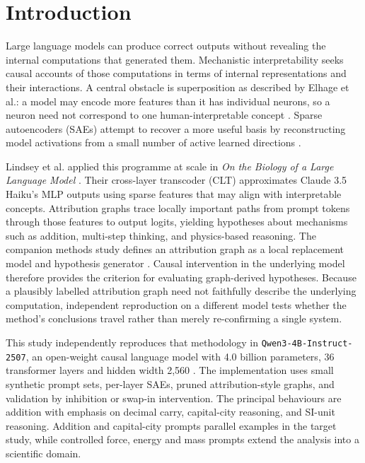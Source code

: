 \documentclass[11pt,a4paper]{article}
\newcommand{\model}{\texttt{Qwen3-4B-Instruct-2507}\xspace}
\begin{document}
\clearpage
\tableofcontents
\clearpage

\section{Introduction}

    Large language models can produce correct outputs without revealing the internal computations that generated them. Mechanistic interpretability seeks causal accounts of those computations in terms of internal representations and their interactions. A central obstacle is superposition as described by Elhage et al.: a model may encode more features than it has individual neurons, so a neuron need not correspond to one human-interpretable concept \cite{elhage2022superposition}. Sparse autoencoders (SAEs) attempt to recover a more useful basis by reconstructing model activations from a small number of active learned directions \cite{cunningham2023sae,bricken2023monosemanticity}.

    Lindsey et al. applied this programme at scale in \emph{On the Biology of a Large Language Model} \cite{lindsey2025biology}. Their cross-layer transcoder (CLT) approximates Claude 3.5 Haiku's MLP outputs using sparse features that may align with interpretable concepts. Attribution graphs trace locally important paths from prompt tokens through those features to output logits, yielding hypotheses about mechanisms such as addition, multi-step thinking, and physics-based reasoning. The companion methods study defines an attribution graph as a local replacement model and hypothesis generator \cite{ameisen2025circuit}. Causal intervention in the underlying model therefore provides the criterion for evaluating graph-derived hypotheses. Because a plausibly labelled attribution graph need not faithfully describe the underlying computation, independent reproduction on a different model tests whether the method's conclusions travel rather than merely re-confirming a single system.

    This study independently reproduces that methodology in \model, an open-weight causal language model with 4.0 billion parameters, 36 transformer layers and hidden width 2,560 \cite{yang2025qwen3,qwenmodelcard}. The implementation uses small synthetic prompt sets, per-layer SAEs, pruned attribution-style graphs, and validation by inhibition or swap-in intervention. The principal behaviours are addition with emphasis on decimal carry, capital-city reasoning, and SI-unit reasoning. Addition and capital-city prompts parallel examples in the target study, while controlled force, energy and mass prompts extend the analysis into a scientific domain.
\end{document}

